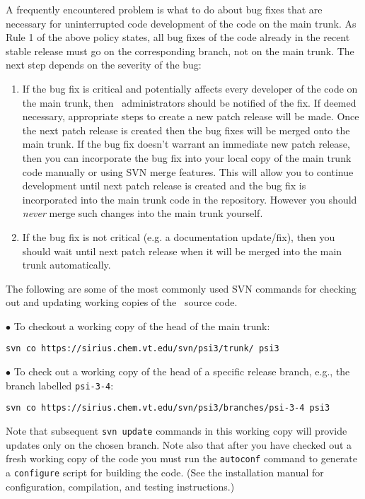 \noindent A frequently encountered problem is what to do about bug fixes
that are necessary for uninterrupted code development of the code on the
main trunk. As Rule 1 of the above policy states, all bug fixes of the code
already in the recent stable release must go on the corresponding branch,
not on the main trunk. The next step depends on the severity of the bug:
\begin{enumerate}
\item If the bug fix is critical and potentially affects every
  developer of the code on the main trunk, then \PSIthree\
  administrators should be notified of the fix. If deemed necessary,
  appropriate steps to create a new patch release will be made. Once
  the next patch release is created then the bug fixes will be merged
  onto the main trunk.  If the bug fix doesn't warrant an immediate
  new patch release, then you can incorporate the bug fix into your
  local copy of the main trunk code manually or using SVN merge
  features. This will allow you to continue development until next
  patch release is created and the bug fix is incorporated into the
  main trunk code in the repository. However you should {\em never}
  merge such changes into the main trunk yourself.
\item If the bug fix is not critical (e.g. a documentation
  update/fix), then you should wait until next patch release when it
  will be merged into the main trunk automatically.
\end{enumerate}

\noindent
The following are some of the most commonly used SVN commands for checking
out and updating working copies of the \PSIthree\ source code.

\noindent
$\bullet$ To checkout a working copy of the head of the main trunk:

{\tt svn co https://sirius.chem.vt.edu/svn/psi3/trunk/ psi3} 

\noindent
$\bullet$ To check out a working copy of the head of a specific release branch,
e.g., the branch labelled {\tt psi-3-4}:

{\tt svn co https://sirius.chem.vt.edu/svn/psi3/branches/psi-3-4 psi3}

\noindent Note that subsequent {\tt svn update} commands in this
working copy will provide updates only on the chosen branch.  Note
also that after you have checked out a fresh working copy of the code
you must run the {\tt autoconf} command to generate a {\tt configure}
script for building the code.  (See the installation manual for
configuration, compilation, and testing instructions.)

